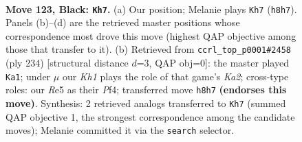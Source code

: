 \documentclass[11pt]{article}
\begin{document}
\begin{figure}[p]\centering
\begin{subfigure}{0.46\textwidth}\centering
\resizebox{\linewidth}{!}{%
\newchessgame
\chessboard[
  setfen={5K1k/8/8/4r3/8/8/8/8 b - - 31 123},
  showmover=false,
  pgfstyle=straightmove, color=movearrow, markmove={h8-h7}
]}
\caption{}
\end{subfigure}\hfill
\begin{subfigure}{0.46\textwidth}\centering
\resizebox{\linewidth}{!}{%
\newchessgame
\chessboard[
  setfen={8/8/8/8/1k3P2/8/K7/8 w - - 6 118},
  showmover=false,
  pgfstyle=straightmove, color=movearrow, markmove={a2-a1}
]}
\caption{}
\end{subfigure}
\\[4pt]

\caption{\textbf{Move 123, Black: \texttt{Kh7}.} (a) Our position; Melanie plays \texttt{Kh7} (\texttt{h8h7}). Panels (b)--(d) are the retrieved master positions whose correspondence most drove this move (highest QAP objective among those that transfer to it). (b) Retrieved from \texttt{ccrl\_top\_p0001\#2458} (ply 234) [structural distance $d$=3, QAP obj=0]: the master played \texttt{Ka1}; under $\mu$ our \emph{Kh1} plays the role of that game's \emph{Ka2}; cross-type roles: our \emph{R}e5 as their \emph{P}f4; transferred move \texttt{h8h7} \textbf{(endorses this move)}. Synthesis: 2 retrieved analogs transferred to \texttt{Kh7} (summed QAP objective 1, the strongest correspondence among the candidate moves); Melanie committed it via the \texttt{search} selector.}
\label{fig:thought-m245}
\end{figure}

\clearpage
\end{document}
